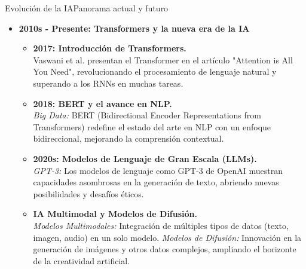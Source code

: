 \documentclass[10pt,border=3pt,tikz]{beamer}
\begin{document}
    \begin{frame}{Evolución de la IA}{Panorama actual y futuro}
        \begin{itemize}
            \item \textbf{2010s - Presente: Transformers y la nueva era de la IA}
            \begin{itemize}
                \item \textbf{2017: Introducción de Transformers.} \\Vaswani et al. presentan el Transformer en el artículo "Attention is All You Need", revolucionando el procesamiento de lenguaje natural y superando a los RNNs en muchas tareas.
                
                \item \textbf{2018: BERT y el avance en NLP.} \\\textit{Big Data:} BERT (Bidirectional Encoder Representations from Transformers) redefine el estado del arte en NLP con un enfoque bidireccional, mejorando la comprensión contextual.
                
                \item \textbf{2020s: Modelos de Lenguaje de Gran Escala (LLMs).} \\\textit{GPT-3:} Los modelos de lenguaje como GPT-3 de OpenAI muestran capacidades asombrosas en la generación de texto, abriendo nuevas posibilidades y desafíos éticos.
                
                \item \textbf{IA Multimodal y Modelos de Difusión.} \\\textit{Modelos Multimodales:} Integración de múltiples tipos de datos (texto, imagen, audio) en un solo modelo. \textit{Modelos de Difusión:} Innovación en la generación de imágenes y otros datos complejos, ampliando el horizonte de la creatividad artificial.
            \end{itemize}
        \end{itemize}
    \end{frame}
    
\end{document}
